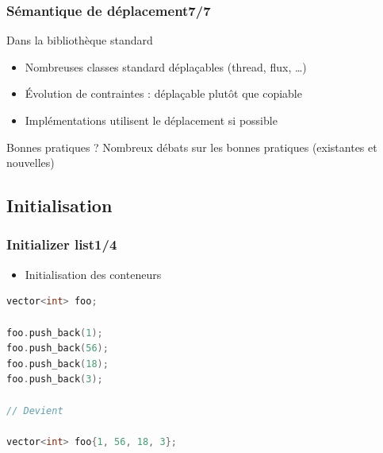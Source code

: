 \documentclass[C++.tex]{subfiles}
\begin{document}
\begin{frame}
	\frametitle{Sémantique de déplacement\titlehfill{}7/7}
	\begin{block}{Dans la bibliothèque standard}
		\begin{itemize}
			\item Nombreuses classes standard déplaçables (thread, flux, \ldots)


			\item Évolution de contraintes : déplaçable plutôt que copiable

			
			\item Implémentations utilisent le déplacement si possible
		\end{itemize}
	\end{block}

	\begin{alertblock}{Bonnes pratiques ?}
		Nombreux débats sur les bonnes pratiques (existantes et nouvelles)

	\end{alertblock}
\end{frame}

\subsection*{Initialisation}
\begin{frame}[fragile]
	\frametitle{Initializer list\titlehfill{}1/4}
	\begin{itemize}
		\item Initialisation des conteneurs
	\end{itemize}

	\begin{lstlisting}[language=C++]
vector<int> foo;

foo.push_back(1);
foo.push_back(56);
foo.push_back(18);
foo.push_back(3);

// Devient

vector<int> foo{1, 56, 18, 3};\end{lstlisting}
\end{frame}
\end{document}

